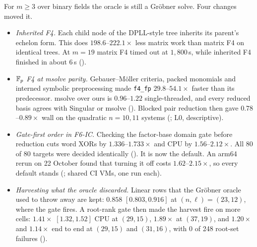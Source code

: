 For $m\ge3$ over binary fields the oracle is still a Gr\"obner solve. Four
changes moved it.
\begin{itemize}
\item \emph{Inherited F4.} Each child node of the DPLL-style tree inherits
  its parent's echelon form. This does $198.6$--$222.1\times$ less matrix
  work than matrix F4 on identical trees. At $m=19$ matrix F4 timed out at
  $1{,}800$\,s, while inherited F4 finished in about 6\,s
  ().
\item \emph{$\mathbb{F}_p$ F4 at msolve parity.} Gebauer--M\"oller criteria,
  packed monomials and interned symbolic preprocessing made
  \texttt{f4\_fp} $29.8$--$54.1\times$ faster than its predecessor. msolve
  over ours is $0.96$--$1.22$ single-threaded, and every reduced basis
  agrees with Singular or msolve
  (). Blocked pair reduction
  then gave $0.78$--$0.89\times$ wall on the quadratic $n=10,11$ systems
  (; L0, descriptive).
\item \emph{Gate-first order in F6-IC.} Checking the factor-base domain
  gate before reduction cuts word XORs by $1.336$--$1.733\times$ and CPU by
  $1.56$--$2.12\times$. All 80 of 80 targets were decided identically
  (). It is now the default. An
  arm64 rerun on 22 October found that turning it off costs
  $1.62$--$2.15\times$, so every default stands
  (; shared CI VMs, one
  run each).
\item \emph{Harvesting what the oracle discarded.} Linear rows that the
  Gr\"obner oracle used to throw away are kept: $0.858$ $[0.803,0.916]$ at
  $(n,\ell)=(23,12)$, where the gate fires. A root-rank gate then made the
  harvest fire on more cells: $1.41\times$ $[1.32,1.52]$ CPU at $(29,15)$,
  $1.89\times$ at $(37,19)$, and $1.20\times$ and $1.14\times$ end to end
  at $(29,15)$ and $(31,16)$, with 0 of 248 root-set failures
  ().
\end{itemize}

